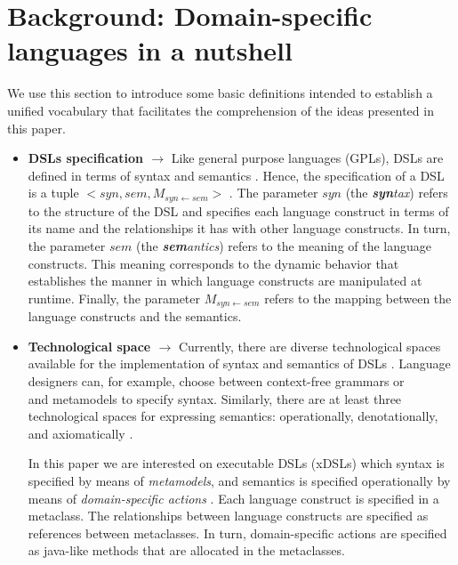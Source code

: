\section{Background: Domain-specific languages in a nutshell}
\label{sec:background}
 
We use this section to introduce some basic definitions intended to establish a unified vocabulary that facilitates the comprehension of the ideas presented in this paper. 
 
\begin{itemize}


\item{\textbf{DSLs specification $\rightarrow$}} Like general purpose languages (GPLs), DSLs are defined in terms of syntax and semantics \cite{Harel:2004b}. Hence, the specification of a DSL is a tuple $<syn,sem,M_{syn\leftarrow sem}>$ \cite{Combemale:2013}. The parameter $syn$ (the \textit{\textbf{syn}tax}) refers to the structure of the DSL and specifies each language construct in terms of its name and the relationships it has with other language constructs. In turn, the parameter $sem$ (the \textit{\textbf{sem}antics}) refers to the meaning of the language constructs. This meaning corresponds to the dynamic behavior that establishes the manner in which language constructs are manipulated at runtime. Finally, the parameter $M_{syn\leftarrow sem}$ refers to the mapping between the language constructs and the semantics. 

\vspace{2mm}

\item{\textbf{Technological space $\rightarrow$}} Currently, there are diverse technological spaces available for the implementation of syntax and semantics of DSLs \cite{Mernik:2005b}. Language designers can, for example, choose between context-free grammars or\\and metamodels to specify syntax. Similarly, there are at least three technological spaces for expressing semantics: operationally, denotationally, and axiomatically \cite{Mosses:2001}.

\hspace{3mm} In this paper we are interested on executable DSLs (xDSLs) which syntax is specified by means of \textit{metamodels}, and semantics is specified operationally by means of \textit{domain-specific actions} \cite{Combemale:2013}. Each language construct is specified in a metaclass. The relationships between language constructs are specified as references between metaclasses. In turn, domain-specific actions are specified as java-like methods that are allocated in the metaclasses.
 

\end{itemize}
